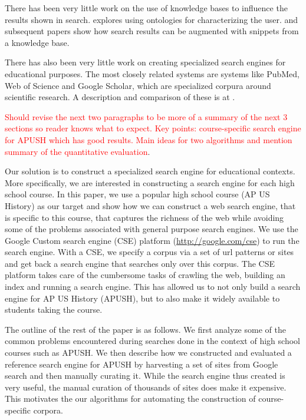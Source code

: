 \documentclass{acm_proc_article-sp}
\begin{document}
 There has been very little work on the use of knowledge bases to influence the
 results shown in search. \cite{jiang2009learning} explores using ontologies for characterizing the 
user. \cite{guha2003semantic} and subsequent papers show how search results can
be augmented with snippets from a knowledge base.  

There has also been very little work on creating specialized search
engines for educational purposes. The most closely related systems are systems
like PubMed, Web of Science and Google Scholar, which are specialized 
corpura around scientific research. A description and comparison of 
these is at \cite{jacso2005google}.   

\textcolor{red}{Should revise the next two paragraphs to be more of a summary of
the next 3 sections so reader knows what to expect. Key points: course-specific
search engine for APUSH which has good results. Main ideas for two algorithms
and mention summary of the quantitative evaluation}.

Our solution is to construct a specialized search engine for
educational contexts. More specifically, we are interested in constructing a
search engine for each high school course. In this paper, we use a popular high
school course (AP US History) as our target and show how we can construct a web
search engine, that is specific to this course, that captures the richness of
the web while avoiding some of the problems associated with general purpose
search engines. We use the Google Custom search engine (CSE) platform
(\url{http://google.com/cse}) to run the search engine. With a CSE, we
specify a corpus via a set of url patterns or sites and get back a search engine
that searches only over this corpus. The CSE platform takes care of the
cumbersome tasks of crawling the web, building an index and running a search
engine. This has allowed us to not only build a search engine for AP US History
(APUSH), but to also make it widely available to students taking the course. 

The outline of the rest of the paper is as follows. We first analyze some of the
common problems encountered during searches done in the context of high school
courses such as APUSH. We then describe how we constructed and evaluated a
reference search engine for APUSH by harvesting a set of sites from Google
search and then manually curating it. While the search engine thus created is
very useful, the manual curation of thousands of sites does make it
expensive. This motivates the our algorithms for automating the construction of
course-specific corpora. 
\end{document}
